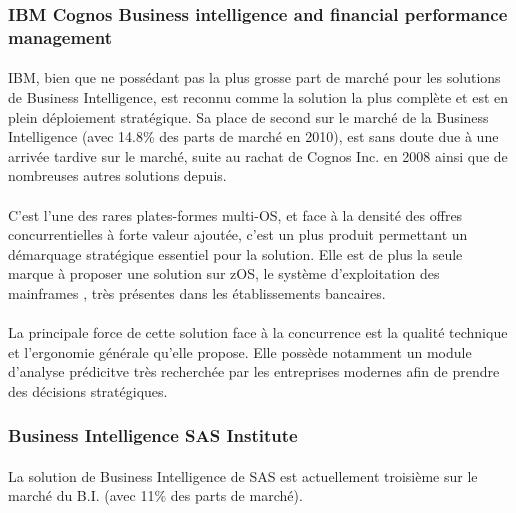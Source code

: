 \subsubsection{IBM Cognos Business intelligence and financial performance management}

\paragraph{} IBM, bien que ne possédant pas la plus grosse part de marché pour les solutions de Business Intelligence, est reconnu comme la solution la plus complète et est en plein déploiement stratégique. Sa place de second sur le marché de la Business Intelligence (avec 14.8\% des parts de marché en 2010), est sans doute due à une arrivée tardive sur le marché, suite au rachat de Cognos Inc. en 2008 ainsi que de nombreuses autres solutions depuis.
	
\paragraph{} C’est l’une des rares plates-formes multi-OS, et face à la densité des offres concurrentielles à forte valeur ajoutée, c’est un plus produit permettant un démarquage stratégique essentiel pour la solution. Elle est de plus la seule marque à proposer  une solution sur zOS, le système d’exploitation des mainframes , très présentes dans les établissements bancaires.
	
\paragraph{} La principale force de cette solution face à la concurrence est la qualité technique et l’ergonomie générale qu’elle propose. Elle possède notamment un module d’analyse prédicitve très recherchée par les entreprises modernes afin de prendre des décisions stratégiques.


\subsubsection{Business Intelligence SAS Institute}


\paragraph{} La solution de Business Intelligence de SAS est actuellement troisième sur le marché du B.I. (avec 11\% des parts de marché).

